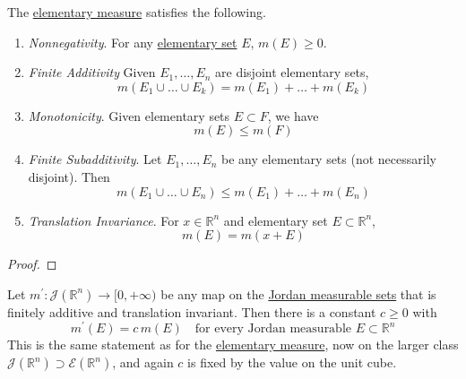   \begin{theorem}
    \label{thm:fundamental-properties-of-jordan-measure}
    The \hyperref[def:elementary-measure]{elementary measure} satisfies the following. 
    \begin{enumerate}
      \item \textit{Nonnegativity}. For any \hyperref[def:elementary-set]{elementary set} $E$, $m(E) \geq 0$. 
      \item \textit{Finite Additivity} Given $E_1, \ldots, E_n$ are disjoint elementary sets, 
      \begin{equation}
        m(E_1 \cup \ldots \cup E_k) = m(E_1) + \ldots + m(E_k)
      \end{equation}

      \item \textit{Monotonicity}. Given elementary sets $E \subset F$, we have 
      \begin{equation}
        m(E) \leq m(F)
      \end{equation}

      \item \textit{Finite Subadditivity}. Let $E_1, \ldots, E_n$ be any elementary sets (not necessarily disjoint). Then 
      \begin{equation}
        m(E_1 \cup \ldots \cup E_n) \leq m(E_1) + \ldots + m(E_n)
      \end{equation}

      \item \textit{Translation Invariance}. For $x \in \mathbb{R}^n$ and elementary set $E \subset \mathbb{R}^n$, 
      \begin{equation}
        m(E) = m(x + E) 
      \end{equation}
    \end{enumerate}
  \end{theorem}
  \begin{proof}
    
  \end{proof}

  \begin{theorem}
    \label{thm:uniqueness-of-jordan-measure}
    Let $m^\prime: \mathcal{J}(\mathbb{R}^n) \to [0, +\infty)$ be any map on the \hyperref[def:jordan-measurable-set-jordan-measure]{Jordan measurable sets} that is finitely additive and translation invariant. Then there is a constant $c \geq 0$ with
    \begin{equation}
      m^\prime (E) = c \, m(E) \quad \text{for every Jordan measurable } E \subset \mathbb{R}^n
    \end{equation}
    This is the same statement as for the \hyperref[thm:uniqueness-of-elementary-measure]{elementary measure}, now on the larger class $\mathcal{J}(\mathbb{R}^n) \supset \mathcal{E}(\mathbb{R}^n)$, and again $c$ is fixed by the value on the unit cube. 
  \end{theorem}

